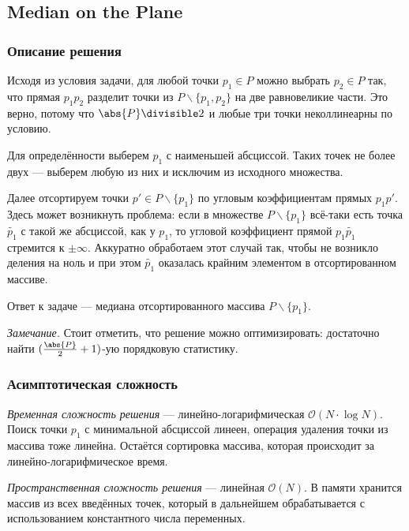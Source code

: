 \subsection{Median on the Plane}

\subsubsection{Описание решения}

Исходя из условия задачи, для любой точки \( p_1\in P \) можно выбрать \( p_2\in P \) так, что прямая \( p_1p_2 \) разделит точки из \( P\backslash\{p_1,p_2\} \) на две равновеликие части. Это верно, потому что \( \abs{P}\divisible 2 \) и любые три точки неколлинеарны по условию.

Для определённости выберем \( p_1 \) с наименьшей абсциссой. Таких точек не более двух --- выберем любую из них и исключим из исходного множества.

Далее отсортируем точки \( p'\in P\backslash\{p_1\} \) по угловым коэффициентам прямых \( p_1p' \). Здесь может возникнуть проблема: если в множестве \( P\backslash\{p_1\} \) всё-таки есть точка \( \tilde{p_1} \) с такой же абсциссой, как у \( p_1 \), то угловой коэффициент прямой \( p_1\tilde{p_1} \) стремится к \( \pm\infty \). Аккуратно обработаем этот случай так, чтобы не возникло деления на ноль и при этом \( \tilde{p_1} \) оказалась крайним элементом в отсортированном массиве.

Ответ к задаче --- медиана отсортированного массива \( P\backslash\{p_1\} \).

\textit{Замечание.} Стоит отметить, что решение можно оптимизировать: достаточно найти \( (\frac{\abs{P}}{2}+1) \)-ую порядковую статистику.

\subsubsection{Асимптотическая сложность}

\textit{Временная сложность решения} --- линейно-логарифмическая \( \mathcal{O}(N\cdot \log N) \). Поиск точки \( p_1 \) с минимальной абсциссой линеен, операция удаления точки из массива тоже линейна. Остаётся сортировка массива, которая происходит за линейно-логарифмическое время. 

\textit{Пространственная сложность решения} --- линейная \( \mathcal{O}(N) \). В памяти хранится массив из всех введённых точек, который в дальнейшем обрабатывается с использованием константного числа переменных.


